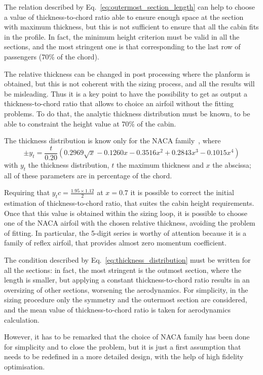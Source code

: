 The relation described by Eq.~\eqref{eq:outermost_section_length} can help to choose a value of thickness-to-chord ratio able to ensure enough space at the section with maximum thickness, but this is not sufficient to ensure that all the cabin fits in the profile.
In fact, the minimum height criterion must be valid in all the sections, and the most stringent one is that corresponding to the last row of passengers (70\% of the chord).

The relative thickness can be changed in post processing where the planform is obtained, but this is not coherent with the sizing process, and all the results will be misleading. 
Thus it is a key point to have the possibility to get as output a thickness-to-chord ratio that allows to choice an airfoil without the fitting problems. 
To do that, the analytic thickness distribution must be known, to be able to constraint the height value at 70\% of the cabin. 

The thickness distribution is know only for the NACA family~\cite{bib:abbott}, where 
\begin{equation}
\label{eq:thickness_distribution}
\pm y_t = \frac{t}{0.20}\left(0.2969\sqrt{x}-0.1260x-0.3516x^2+0.2843x^3-0.1015x^4\right)
\end{equation}
with $y_t$ the thickness distribution, $t$ the maximum thickness and $x$ the abscissa; all of these parameters are in percentage of the chord. 

Requiring that $y_t c=\frac{1.95\times 1.12}{2}$ at $x=0.7$ it is possible to correct the initial estimation of thickness-to-chord ratio, that suites the cabin height requirements. 
Once that this value is obtained within the sizing loop, it is possible to choose one of the NACA airfoil with the chosen relative thickness, avoiding the problem of fitting.
In particular, the 5-digit series is worthy of attention because it is a family of reflex airfoil, that provides almost zero momentum coefficient.  

The condition described by Eq.~\eqref{eq:thickness_distribution} must be written for all the sections: in fact, the most stringent is the outmost section, where the length is smaller, but applying a constant thickness-to-chord ratio results in an oversizing of other sections, worsening the aerodynamics. 
For simplicity, in the sizing procedure only the symmetry and the outermost section are considered, and the mean value of thickness-to-chord ratio is taken for aerodynamics calculation. 

However, it has to be remarked that the choice of NACA family has been done for simplicity and to close the problem, but it is just a first assumption that needs to be redefined in a more detailed design, with the help of high fidelity optimisation.

